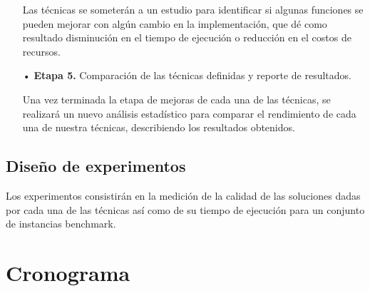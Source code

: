 \documentclass[letterpaper,10pt]{article}
\begin{document}
\begin{itemize}
\item[] Las técnicas se someterán a un estudio para identificar si algunas funciones se pueden mejorar con algún cambio en la implementación, que dé como resultado disminución en el tiempo de ejecución o reducción en el costos de recursos.


\item[•] \textbf{Etapa 5.} Comparación de las técnicas definidas y reporte de resultados.

\item[] Una vez terminada la etapa de mejoras de cada una de las técnicas, se realizará un nuevo análisis estadístico para comparar el rendimiento de cada una de nuestra técnicas, describiendo los resultados obtenidos.
        
  \end{itemize}

\subsection{\textbf{Diseño de experimentos}}
Los experimentos consistirán en la medición de la calidad de las soluciones dadas por cada una de las técnicas así como de su tiempo de ejecución para un conjunto de instancias benchmark.
         
\section{Cronograma}
\begin{table}[H]
\centering

\label{tablaTiempos}
\caption{Cronograma}
\end{table}
\end{document}
